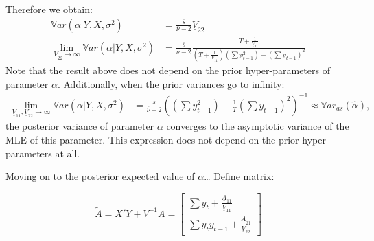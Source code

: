 \documentclass[
  letterpaper,
  DIV=11,
  numbers=noendperiod]{scrreprt}
\begin{document}
Therefore we obtain: \begin{align*}
\mathbb{V}ar\left(\alpha|Y,X,\sigma^2\right) &= \frac{\overline{s}}{\overline{\nu}-2}\underline{V}_{22}\\[1ex]
\lim_{\underline{V}_{22}\rightarrow\infty}\mathbb{V}ar\left(\alpha|Y,X,\sigma^2\right) &= \frac{\overline{s}}{\overline{\nu}-2} \frac{T + \frac{1}{\underline{V}_{11}}}{ \left( T + \frac{1}{\underline{V}_{11}} \right)\left(\sum y_{t-1}^2  \right) - \left( \sum y_{t-1}\right)^2 }
\end{align*} Note that the result above does not depend on the prior
hyper-parameters of parameter \(\alpha\). Additionally, when the prior
variances go to infinity: \begin{align*}
\lim_{\underline{V}_{11},\underline{V}_{22}\rightarrow\infty}\mathbb{V}ar\left(\alpha|Y,X,\sigma^2\right) &= \frac{\overline{s}}{\overline{\nu}-2} \left( \left(\sum y_{t-1}^2  \right) - \frac{1}{T}\left( \sum y_{t-1}\right)^2  \right)^{-1} \approx \mathbb{V}ar_{as}\left(\hat\alpha\right),
\end{align*} the posterior variance of parameter \(\alpha\) converges to
the asymptotic variance of the MLE of this parameter. This expression
does not depend on the prior hyper-parameters at all.

\bigskip Moving on to the posterior expected value of \(\alpha\)\ldots{}
Define matrix:

\[
\tilde{A} = X'Y + \underline{V}^{-1}\underline{A} = \begin{bmatrix} \sum y_t + \frac{\underline{A}_{11}}{\underline{V}_{11}} \\ \sum y_t y_{t-1} + \frac{\underline{A}_{21}}{\underline{V}_{22}} \end{bmatrix}
\]
\end{document}
